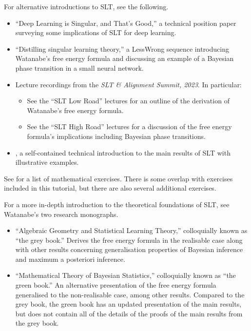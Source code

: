 \documentclass[11pt]{article}
\begin{document}
For alternative introductions to SLT, see the following.
\begin{itemize}
    \item
        \citet{Wei+2023} ``Deep Learning is Singular, and That's Good,'' a technical position paper surveying some implications of SLT for deep learning.
    \item
        \citet{Carroll2023} ``Distilling singular learning theory,'' a LessWrong sequence introducing Watanabe's free energy formula and discussing an example of a Bayesian phase transition in a small neural network.
    \item 
        Lecture recordings from the \textit{SLT \& Alignment Summit, 2023}. In particular:
        \begin{itemize}
            \item See the ``SLT Low Road'' lectures \citep{Lau+Chen2023} for an outline of the derivation of Watanabe's free energy formula.
            \item See the ``SLT High Road'' lectures \citep{Murfet+Carroll2023} for a discussion of the free energy formula's implications including Bayesian phase transitions.
        \end{itemize}
    \item
        \citet[][Chapter~2, ``Singular Learning Theory Background'']{Lau2025}, a self-contained technical introduction to the main results of SLT with illustrative examples.
\end{itemize}

See \citet{Furman2024} for a list of mathematical exercises. There is some overlap with exercises included in this tutorial, but there are also several additional exercises.

For a more in-depth introduction to the theoretical foundations of SLT, see Watanabe's two research monographs.
\begin{itemize}
    \item
        \citet{Watanabe2009} ``Algebraic Geometry and Statistical Learning Theory,'' colloquially known as ``the grey book.'' Derives the free energy formula in the realisable case along with other results concerning generalisation properties of Bayesian inference and maximum a posteriori inference.
    \item 
        \citet{Watanabe2018} ``Mathematical Theory of Bayesian Statistics,'' colloquially known as ``the green book.'' An alternative presentation of the free energy formula generalised to the non-realisable case, among other results. Compared to the grey book, the green book has an updated presentation of the main results, but does not contain all of the details of the proofs of the main results from the grey book.
\end{itemize}
\end{document}
